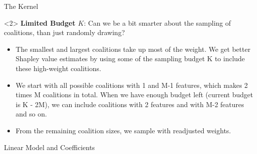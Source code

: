\documentclass[11pt,compress,t,notes=noshow, aspectratio=169, xcolor=table]{beamer}
\begin{document}
\begin{vbframe}{The Kernel}
\begin{onlyenv}<2>
\textbf{Limited Budget $K$}: Can we be a bit smarter about the sampling of coalitions, than just randomly drawing?
\begin{itemize}
    \item The smallest and largest coalitions take up most of the weight. We get better Shapley value estimates by using some of the sampling budget K to include these high-weight coalitions.
    \item We start with all possible coalitions with 1 and M-1 features, which makes 2 times M coalitions in total. When we have enough budget left (current budget is K - 2M), we can include coalitions with 2 features and with M-2 features and so on.
    \item From the remaining coalition sizes, we sample with readjusted weights.
\end{itemize}
\end{onlyenv}
  

 \end{vbframe}
 
 \begin{vbframe}{Linear Model and Coefficients}

 \end{vbframe}
\end{document}
